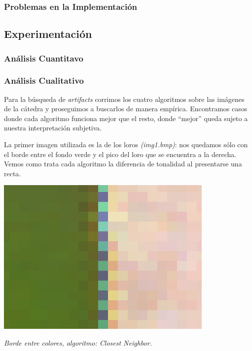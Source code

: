 \subsubsection{Problemas en la Implementación}

	
\subsection{Experimentación}


\subsubsection{Análisis Cuantitavo}

\subsubsection{Análisis Cualitativo}

Para la búsqueda de \textit{artifacts} corrimos los cuatro algoritmos sobre las imágenes de la cátedra y proseguimos a buscarlos de manera empírica. Encontramos casos donde cada algoritmo funciona mejor que el resto, donde ``mejor'' queda sujeto a nuestra interpretación subjetiva.

La primer imagen utilizada es la de los loros \textit{(img1.bmp)}: nos quedamos sólo con el borde entre el fondo verde y el pico del loro que se encuentra a la derecha. Vemos como trata cada algoritmo la diferencia de tonalidad al presentarse una recta. 

	\begin{center}
		\includegraphics[scale=.5]{../enunciado/images_files/cualitativo/pico_loro_closest.png}
		\vspace{2pt}
		\par
		\footnotesize\textit{Borde entre colores, algoritmo: Closest Neighbor.}
	\end{center}

